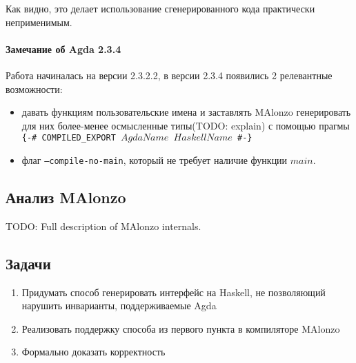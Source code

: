 Как видно, это делает использование сгенерированного кода
практически неприменимым.

\paragraph{Замечание об Agda 2.3.4}

Работа начиналась на версии 2.3.2.2, в версии 2.3.4 появились 2 релевантные возможности:
\begin{itemize}
\item давать функциям пользовательские имена и заставлять MAlonzo генерировать для них
      более-менее осмысленные типы(TODO: explain) с помощью прагмы
      \texttt{\{-\# COMPILED\_EXPORT \(AgdaName\) \(HaskellName\) \#-\}}
      \label{text:agda-compiled-export}
\item флаг \texttt{---compile-no-main}, который не требует наличие функции \(main\).
\end{itemize}

\subsection{Анализ MAlonzo}

TODO: Full description of MAlonzo internals.

\subsection{Задачи}

\begin{enumerate}
\item Придумать способ генерировать интерфейс на Haskell, не позволяющий
      нарушить инварианты, поддерживаемые Agda
\item Реализовать поддержку способа из первого пункта в компиляторе MAlonzo
\item Формально доказать корректность
\end{enumerate}
